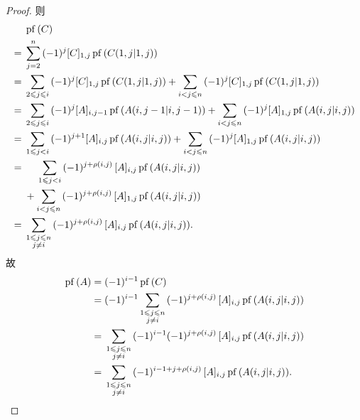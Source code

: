 \begin{proof}
    则
    \begin{align*}
             &
        \operatorname{pf} {(C)}
        \\
        = {} &
        \sum_{j = 2}^{n}
        {(-1)^{j} [C]_{1,j}
        \operatorname{pf} {(C({1,j}|{1,j}))}}
        \\
        = {} &
        \sum_{2 \leq j \leq i}
        {(-1)^{j} [C]_{1,j}
        \operatorname{pf} {(C({1,j}|{1,j}))}}
        +
        \sum_{i < j \leq n}
        {(-1)^{j} [C]_{1,j}
        \operatorname{pf} {(C({1,j}|{1,j}))}}
        \\
        = {} &
        \sum_{2 \leq j \leq i}
        {(-1)^{j} [A]_{i,j-1}
        \operatorname{pf} {(A({i,j-1}|{i,j-1}))}}
        +
        \sum_{i < j \leq n}
        {(-1)^{j} [A]_{1,j}
        \operatorname{pf} {(A({i,j}|{i,j}))}}
        \\
        = {} &
        \sum_{1 \leq j < i}
        {(-1)^{j+1} [A]_{i,j}
        \operatorname{pf} {(A({i,j}|{i,j}))}}
        +
        \sum_{i < j \leq n}
        {(-1)^{j} [A]_{1,j}
        \operatorname{pf} {(A({i,j}|{i,j}))}}
        \\
        = {} &
        \hphantom{{} + {}}
        \sum_{1 \leq j < i}
        {(-1)^{j+\rho(i,j)}\, [A]_{i,j}
        \operatorname{pf} {(A({i,j}|{i,j}))}}
        \\
             &
        +
        \sum_{i < j \leq n}
        {(-1)^{j+\rho(i,j)}\, [A]_{1,j}
        \operatorname{pf} {(A({i,j}|{i,j}))}}
        \\
        = {} &
        \sum_{\substack{1 \leq j \leq n \\j \neq i}}
        {(-1)^{j+\rho(i,j)}\, [A]_{i,j}
        \operatorname{pf} {(A({i,j}|{i,j}))}}.
    \end{align*}
    故
    \begin{align*}
        \operatorname{pf} {(A)}
        = {} &
        (-1)^{i-1}
        \operatorname{pf} {(C)}
        \\
        = {} &
        (-1)^{i-1}
        \sum_{\substack{1 \leq j \leq n \\j \neq i}}
        {(-1)^{j+\rho(i,j)}\, [A]_{i,j}
        \operatorname{pf} {(A({i,j}|{i,j}))}}
        \\
        = {} &
        \sum_{\substack{1 \leq j \leq n \\j \neq i}}
        {
        (-1)^{i-1}
        (-1)^{j+\rho(i,j)}\, [A]_{i,j}
        \operatorname{pf} {(A({i,j}|{i,j}))}}
        \\
        = {} &
        \sum_{\substack{1 \leq j \leq n \\j \neq i}}
        {
        (-1)^{i-1+j+\rho(i,j)}\, [A]_{i,j}
        \operatorname{pf} {(A({i,j}|{i,j}))}}.
        \qedhere
    \end{align*}
\end{proof}

